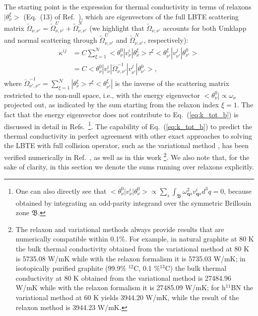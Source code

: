 \documentclass[
prb,
twocolumn,
superscriptaddress,
 amsmath,amssymb,
 aps,
longbibliography,
]{revtex4-2}
\begin{document}
The starting point is the expression for thermal conductivity in terms of relaxons $|\theta^{\xi}_{\nu}\big>$ (Eq.~(13) of Ref.~\cite{cepellotti_thermal_2016}), which are eigenvectors of the full LBTE scattering matrix $\widetilde{\Omega}_{\nu,\nu'}= \widetilde{\Omega}^U_{\nu,\nu'}+\widetilde{\Omega}^N_{\nu,\nu'}$ (we highlight that $\widetilde{\Omega}_{\nu,\nu'}$ accounts for both Umklapp and normal scattering through $\widetilde{\Omega}^U_{\nu,\nu'}$ and $\widetilde{\Omega}^N_{\nu,\nu'}$, respectively):
\begin{equation}
\begin{split}
  \kappa^{ij}
&= C  \sum_{\xi=1}^{\mathcal{N}}
\big<\theta^{0}_{\nu} | v^i_{\nu} |\theta^{\xi}_{\nu}\big>\tau^\xi
\big<\theta^{\xi}_{\nu'} | {v}^j_{\nu'} | \theta^{0}_{\nu'}\big> \\
&= C
\big<\theta^{0}_{\nu} | v^i_{\nu} |
{{\breve{\Omega}}^{-1}_{\nu,\nu'}} | {v}^j_{\nu'} | \theta^{0}_{\nu'}\big>,
\end{split}
\label{eq:k_tot_b}
\end{equation}
where
${{\breve{\Omega}}^{-1}_{\nu',\nu''}}=\sum_{\xi=1}^{\mathcal{N}}|\theta^{\xi}_{\nu}\big>\tau^\xi
\big<\theta^{\xi}_{\nu'} |$ is the inverse of the scattering matrix restricted to the non-null space, i.e., with the energy eigenvector $\big<\theta^{0}_{\nu}\big|\propto \omega_{\nu}$ projected out, as indicated by
the sum starting from the relaxon index $\xi=1$.
The fact that the energy eigenvector does not contribute to Eq.~(\ref{eq:k_tot_b}) is discussed in detail in Refs.~\cite{Simoncelli2020,spohn_phonon_2006}\footnote{One can also directly see that $\big<\theta^{0}_{\nu}\big| v^i_\nu \big|\theta^{0}_{\nu}\big>\propto \sum_s\int_{\mathfrak{B}}\omega_{\bm{q}s}^2 v^i_{\bm{q}s} d^3q =0$, because obtained by integrating an odd-parity integrand over the symmetric Brillouin zone $\mathfrak{B}$.}.
The capability of Eq.~(\ref{eq:k_tot_b}) to predict the thermal conductivity in perfect agreement with other exact approaches to solving the LBTE with full collision operator, such as the variational method \cite{fugallo_ab_2013}, has been verified numerically in Ref.~\cite{cepellotti_thermal_2016}, as well as in this work \footnote{The relaxon \cite{cepellotti_thermal_2016} and variational \cite{fugallo_ab_2013} methods always provide results that are numerically compatible within 0.1\%. For example, in natural graphite at 80 K the bulk thermal conductivity obtained from the variational method \cite{fugallo_ab_2013} at 80 K is 5735.08 W/mK while with the relaxon formalism it is 5735.03 W/mK; in isotopically purified graphite (99.9\% $^{12}$C, 0.1 \%$^{13}$C) the bulk thermal conductivity at 80 K obtained from the variational method is 27484.96 W/mK while with the relaxon formalism it is 27485.09 W/mK; for h$^{11}$BN the variational method at 60 K yields 3944.20 W/mK, while the result of the relaxon method is 3944.23 W/mK.}. We also note that, for the sake of clarity, in this section we denote the sums running over relaxons explicitly.
\end{document}
